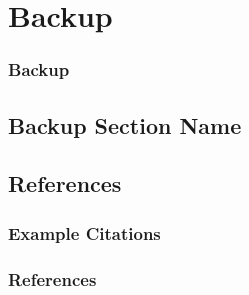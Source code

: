 \backupbegin

\section*{Backup} %


\begin{frame}\frametitle{Backup}
\end{frame}

\subsection*{Backup Section Name}




\subsection*{References}

\begin{frame}\frametitle{Example Citations}
\cite{knacke1968apollo}
\cite{mckinney2013boeing}
\cite{adams2009mars}
\cite{ray2015pendulum}
\cite{ali2017orion}
\cite{anderson2017subscale}

\end{frame}


\begin{frame}[allowframebreaks]\frametitle{References}
\end{frame}


\backupend



